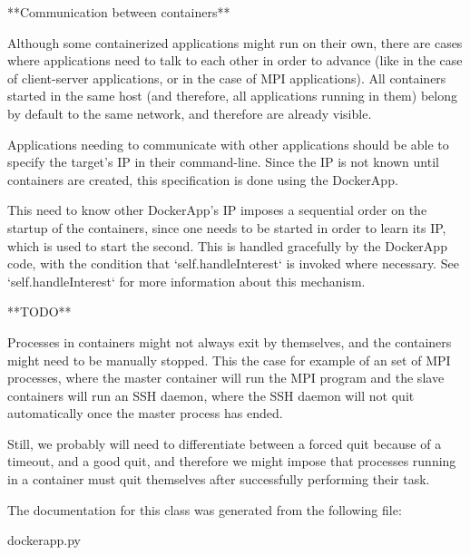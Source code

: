 \begin{DoxyVerb}
**Communication between containers**

Although some containerized applications might run on their own, there are
cases where applications need to talk to each other in order to advance
(like in the case of client-server applications, or in the case of MPI
applications). All containers started in the same host (and therefore, all
applications running in them) belong by default to the same network, and
therefore are already visible.

Applications needing to communicate with other applications should be able
to specify the target's IP in their command-line. Since the IP is not known
until containers are created, this specification is done using the
DockerApp.

This need to know other DockerApp's IP imposes a sequential order on the
startup of the containers, since one needs to be started in order to learn
its IP, which is used to start the second. This is handled gracefully by
the DockerApp code, with the condition that `self.handleInterest` is invoked
where necessary. See `self.handleInterest` for more information about this
mechanism.

**TODO**

Processes in containers might not always exit by themselves, and the
containers might need to be manually stopped. This the case for example of
an set of MPI processes, where the master container will run the MPI
program and the slave containers will run an SSH daemon, where the SSH
daemon will not quit automatically once the master process has ended.

Still, we probably will need to differentiate between a forced quit because
of a timeout, and a good quit, and therefore we might impose that processes
running in a container must quit themselves after successfully performing
their task.
\end{DoxyVerb}
 

The documentation for this class was generated from the following file\+:\begin{DoxyCompactItemize}
\item 
dockerapp.\+py\end{DoxyCompactItemize}
